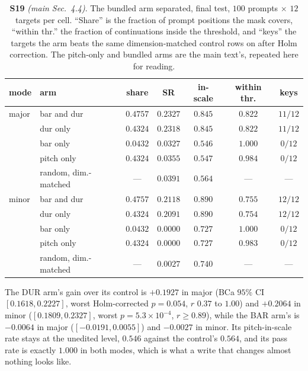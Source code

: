 \documentclass{article}
\begin{document}
\begin{table}[!t]
\centering
\caption{\textbf{S19} \textit{(main Sec.~4.4)}. The bundled arm separated, final test,
$100$ prompts $\times$ $12$ targets per cell. ``Share'' is the fraction of prompt
positions the mask covers, ``within thr.'' the fraction of continuations inside the
threshold, and ``keys'' the targets the arm beats the same dimension-matched control
rows on after Holm correction. The pitch-only and bundled arms are the main text's,
repeated here for reading.}
\label{tab:supp-bardur}
\footnotesize
\setlength{\tabcolsep}{4pt}
\begin{tabular}{@{}llccccc@{}}
\toprule
mode & arm & share & SR & in-scale & within thr. & keys\\
\midrule
major & bar and dur   & $0.4757$ & $0.2327$ & $0.845$ & $0.822$ & $11/12$\\
      & dur only      & $0.4324$ & $0.2318$ & $0.845$ & $0.822$ & $11/12$\\
      & bar only      & $0.0432$ & $0.0327$ & $0.546$ & $1.000$ & $0/12$\\
      & pitch only    & $0.4324$ & $0.0355$ & $0.547$ & $0.984$ & $0/12$\\
      & random, dim.-matched & --- & $0.0391$ & $0.564$ & --- & ---\\
\midrule
minor & bar and dur   & $0.4757$ & $0.2118$ & $0.890$ & $0.755$ & $12/12$\\
      & dur only      & $0.4324$ & $0.2091$ & $0.890$ & $0.754$ & $12/12$\\
      & bar only      & $0.0432$ & $0.0000$ & $0.727$ & $1.000$ & $0/12$\\
      & pitch only    & $0.4324$ & $0.0000$ & $0.727$ & $0.983$ & $0/12$\\
      & random, dim.-matched & --- & $0.0027$ & $0.740$ & --- & ---\\
\bottomrule
\end{tabular}
\end{table}

The DUR arm's gain over its control is $+0.1927$ in major (BCa $95\%$ CI
$[0.1618,0.2227]$, worst Holm-corrected $p=0.054$, $r$ $0.37$ to $1.00$) and
$+0.2064$ in minor ($[0.1809,0.2327]$, worst $p=5.3\times10^{-4}$, $r\ge0.89$),
while the BAR arm's is $-0.0064$ in major ($[-0.0191,0.0055]$) and $-0.0027$ in minor.
Its pitch-in-scale rate stays at the unedited level, $0.546$ against the control's $0.564$,
and its pass rate is exactly $1.000$ in both modes, which is what a write that
changes almost nothing looks like.
\end{document}
